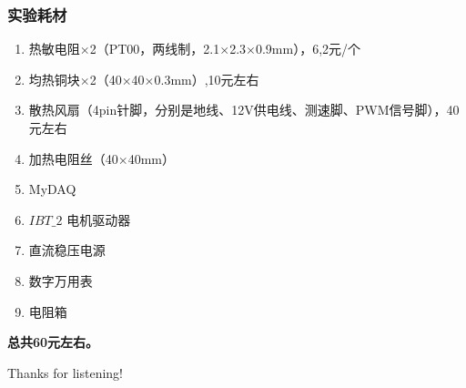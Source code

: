 \documentclass[aspectratio=169]{beamer}
\begin{document}
	\begin{frame}
		\frametitle{实验耗材}
		
		
			\begin{enumerate}
				\item 热敏电阻$\times$2（PT00，两线制，2.1$\times$2.3$\times$0.9mm），6,2元/个
				\item 均热铜块$\times$2（40$\times$40$\times$0.3mm）,10元左右
				\item 散热风扇（4pin针脚，分别是地线、12V供电线、测速脚、PWM信号脚），40元左右
				\item 加热电阻丝（40$\times$40mm）
				\item MyDAQ
				\item $IBT\_2$ 电机驱动器
				\item 直流稳压电源
				\item 数字万用表
				\item 电阻箱
			\end{enumerate}	

		\textbf{总共60元左右。}
		
		
	\end{frame}
	

	
	\begin{frame}[plain]
		
		\begin{center}
			{\Huge\calligra Thanks for listening!}
		\end{center}
		
	\end{frame}
	
	
	
	
	
	
	
\end{document}
